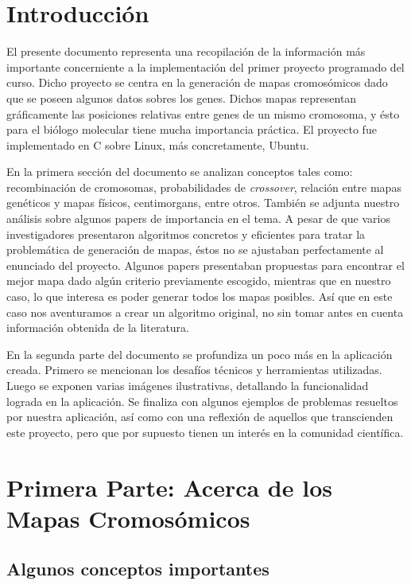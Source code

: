 \documentclass{article}
\begin{document}
	

	\tableofcontents
	\pagebreak
	
	\section{Introducción}
	
	El presente documento representa una recopilación de la información más importante concerniente a la implementación del primer proyecto programado del curso. Dicho proyecto se centra en la generación de mapas cromosómicos dado que se poseen  algunos datos sobres los genes. Dichos mapas representan gráficamente las posiciones relativas entre genes de un mismo cromosoma, y ésto para el biólogo molecular tiene mucha importancia práctica. El proyecto fue implementado en C sobre Linux, más concretamente, Ubuntu.
	
	En la primera sección del documento se analizan conceptos tales como: recombinación de cromosomas, probabilidades de \emph{crossover}, relación entre mapas genéticos y mapas físicos, centimorgans, entre otros. También se adjunta nuestro análisis sobre algunos papers de importancia en el tema. A pesar de que varios investigadores presentaron algoritmos concretos y eficientes para tratar la problemática de generación de mapas, éstos no se ajustaban perfectamente al enunciado del proyecto. Algunos papers presentaban propuestas para encontrar el mejor mapa dado algún criterio previamente escogido, mientras que en nuestro caso, lo que  interesa es poder generar todos los mapas posibles. Así que en este caso nos aventuramos a crear un algoritmo original, no sin tomar antes en cuenta información obtenida de la literatura.
	
	En la segunda parte del documento se profundiza un poco más en la aplicación creada. Primero se mencionan los desafíos técnicos y herramientas utilizadas. Luego se exponen varias imágenes ilustrativas, detallando la funcionalidad lograda en la aplicación. Se finaliza con algunos ejemplos de problemas resueltos por nuestra aplicación, así como con una reflexión de aquellos que transcienden este proyecto, pero que por supuesto tienen un interés en la comunidad científica.
	
	\section{Primera Parte: Acerca de los Mapas Cromosómicos}
	
	\subsection{Algunos conceptos importantes}
	
\end{document}
